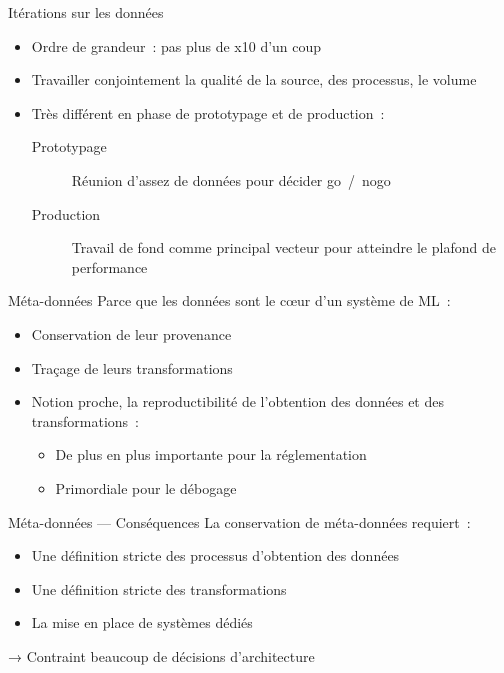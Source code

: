 \begin{frame}{Itérations sur les données}
  \begin{itemize}
    \item Ordre de grandeur~: pas plus de x10 d'un coup
    \item Travailler conjointement la qualité de la source, des processus, le volume
    \item Très différent en phase de prototypage et de production~:
      \begin{description}
        \item[Prototypage] Réunion d'assez de données pour décider go~/~nogo
        \item[Production] Travail de fond comme principal vecteur pour atteindre le plafond de performance
      \end{description}
  \end{itemize}
\end{frame}

\begin{frame}{Méta-données}
  Parce que les données sont le cœur d'un système de ML~:
  \begin{itemize}
    \item Conservation de leur provenance
    \item Traçage de leurs transformations
    \item Notion proche, la reproductibilité de l'obtention des données et des transformations~:
      \begin{itemize}
        \item De plus en plus importante pour la réglementation
        \item Primordiale pour le débogage
      \end{itemize}
  \end{itemize}
\end{frame}

\begin{frame}{Méta-données — Conséquences}
  La conservation de méta-données requiert~:

  \begin{itemize}
    \item Une définition stricte des processus d'obtention des données
    \item Une définition stricte des transformations
    \item La mise en place de systèmes dédiés
  \end{itemize}

  → Contraint beaucoup de décisions d'architecture
\end{frame}

